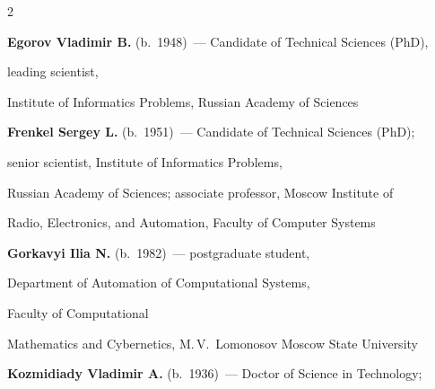 \begin{multicols}{2}
\vspace*{3pt}













\noindent %

\textbf{Egorov Vladimir B.} (b.\ 1948)~--- Candidate of Technical Sciences (PhD),

leading scientist,

Institute of Informatics Problems, Russian Academy of Sciences



\vspace*{3pt}



\noindent

\textbf{Frenkel Sergey L.} (b.\ 1951)~--- Candidate of Technical Sciences (PhD);

senior scientist, Institute of Informatics Problems,

Russian Academy of Sciences; associate professor, Moscow Institute of

Radio, Electronics, and Automation, Faculty of Computer Systems



\vspace*{3pt}



\noindent

\textbf{Gorkavyi Ilia N.} (b.\ 1982)~--- postgraduate student,

Department of Automation of Computational Systems,

Faculty of  Computational

Mathematics and Cybernetics, M.\,V.~Lomonosov Moscow State University



\vspace*{3pt}



\noindent

\textbf{Kozmidiady Vladimir A.} (b.\ 1936)~--- Doctor of Science in Technology;


\end{multicols}
